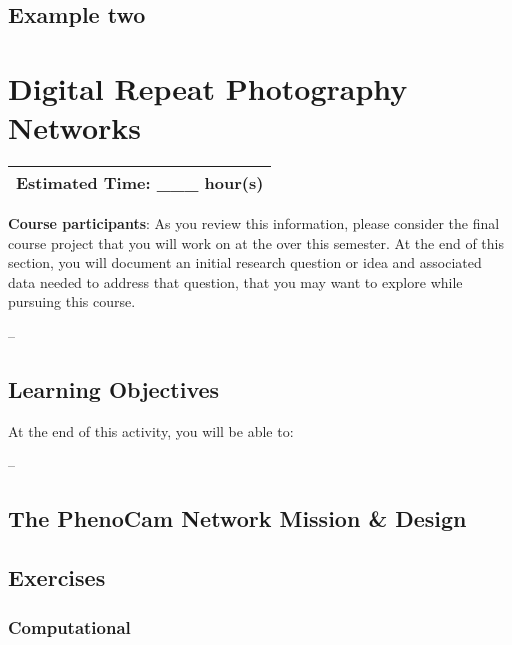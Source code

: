 \documentclass[]{book}
\begin{document}
\hypertarget{example-two}{%
\section{Example two}\label{example-two}}

\hypertarget{digital-repeat-photography-networks}{%
\chapter{Digital Repeat Photography Networks}\label{digital-repeat-photography-networks}}

\begin{longtable}[]{@{}l@{}}
\toprule
\endhead
Estimated Time: \_\_\_ hour(s)\tabularnewline
\bottomrule
\end{longtable}

\leavevmode\hypertarget{ds-challenge}{}%
\textbf{Course participants}: As you review this information, please
consider the
final course project
that you will work on at the over this semester. At the end of this section, you will
document an initial research question or idea and associated data needed to
address that question, that you may want to explore while pursuing this course.

\leavevmode\hypertarget{ds-objectives}{}%
--

\hypertarget{learning-objectives}{%
\section{Learning Objectives}\label{learning-objectives}}

At the end of this activity, you will be able to:

--

\hypertarget{the-phenocam-network-mission-design}{%
\section{The PhenoCam Network Mission \& Design}\label{the-phenocam-network-mission-design}}

\hypertarget{exercises}{%
\section{Exercises}\label{exercises}}

\hypertarget{computational}{%
\subsection{Computational}\label{computational}}
\end{document}
